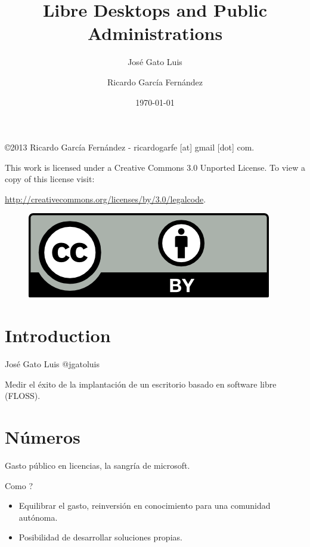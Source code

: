 \documentclass[11pt]{scrartcl}
\title{\textbf{Libre Desktops and Public Administrations}}
\subtitle{Jos\'e Gato Luis}
\author{Ricardo Garc\'ia Fern\'andez}
\date{\today}
\begin{document}
\maketitle

\vfill

\begin{flushright}
    \copyright  2013 Ricardo Garc\'ia Fern\'andez - ricardogarfe [at] gmail [dot] com.

    This work is licensed under a Creative Commons 3.0 Unported License.
    To view a copy of this license visit:
 
    \url{http://creativecommons.org/licenses/by/3.0/legalcode}.
\end{flushright}

\begin{figure}[h]
    \begin{flushright}	
        \includegraphics{by}
        \label{fig:by}
    \end{flushright}
\end{figure}

\newpage

\section{Introduction}
\label{sec:introduction}

Jos\'e Gato Luis @jgatoluis

\par Medir el \'exito de la implantaci\'on de un escritorio basado en software libre (FLOSS).


\section{N\'umeros}
\label{sec:numeros}

Gasto p\'ublico en licencias, la sangr\'ia de microsoft.

\par Como ?
\begin{itemize}
	\item Equilibrar el gasto, reinversi\'on en conocimiento para una comunidad aut\'onoma.
	\item Posibilidad de desarrollar soluciones propias.
\end{itemize}
\end{document}

